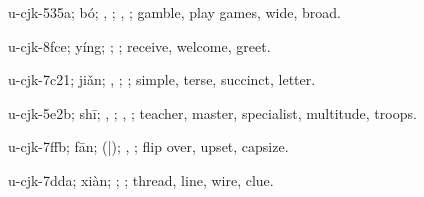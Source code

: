 \begin{multicols}{2}
{\cjkgGlue{}u-cjk-535a; bó; \cjkgGlue{}, \cjkgGlue{}; \cjkgGlue{}, \cjkgGlue{}; gamble, play games, wide, broad.

\cjkgGlue{}u-cjk-8fce; yíng; \cjkgGlue{}\cjkgGlue{}\cjkgGlue{}; \cjkgGlue{}; receive, welcome, greet.

\cjkgGlue{}u-cjk-7c21; jiǎn; \cjkgGlue{}, \cjkgGlue{}; \cjkgGlue{}; simple, terse, succinct, letter.

\cjkgGlue{}u-cjk-5e2b; shī; \cjkgGlue{}, \cjkgGlue{}\cjkgGlue{}\cjkgGlue{}; \cjkgGlue{}, \cjkgGlue{}; teacher, master, specialist, multitude, troops.

\cjkgGlue{}u-cjk-7ffb; fān; \cjkgGlue{}\cjkgGlue{}(\cjkgGlue{}|\cjkgGlue{}); \cjkgGlue{}, \cjkgGlue{}; flip over, upset, capsize.

\cjkgGlue{}u-cjk-7dda; xiàn; \cjkgGlue{}; \cjkgGlue{}; thread, line, wire, clue.

}
\end{multicols}
